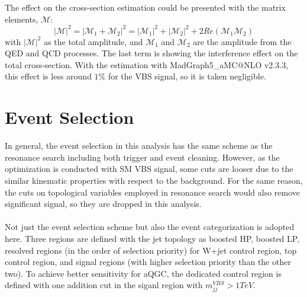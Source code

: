 The effect on the cross-section estimation could be presented with the matrix elements, $\mathcal{M}$: 
\begin{equation}
|\mathcal{M}|^2=|\mathcal{M}_1+\mathcal{M}_2|^2 = |\mathcal{M}_1|^2+|\mathcal{M}_2|^2+2Re(\mathcal{M}_1\mathcal{M}_2)
\end{equation}
with $|\mathcal{M}|^2$ as the total amplitude, and $\mathcal{M}_1$ and $\mathcal{M}_2$ are the amplitude from the QED and QCD processes. The last term is showing the interference effect on the total cross-section. With the estimation with MadGraph5\_aMC@NLO v2.3.3, this effect is less around $1\%$ for the VBS signal, so it is taken negligible.
\section{Event Selection}
In general, the event selection in this analysis has the same scheme as the resonance search including both trigger and event cleaning. However, as the optimization is conducted with SM VBS signal, some cuts are looser due to the similar kinematic properties with respect to the background. For the same reason, the cuts on topological variables employed in resonance search would also remove significant signal, so they are dropped in this analysis.
\\
\\Not just the event selection scheme but also the event categorization is adopted here. Three regions are defined with the jet topology as boosted HP, boosted LP, resolved regions (in the order of selection priority) for W+jet control region, top control region, and signal regions (with higher selection priority than the other two). To achieve better sensitivity for aQGC, the dedicated control region is defined with one addition cut in the siganl region with $m^{VBS}_{jj}>1TeV$. 
